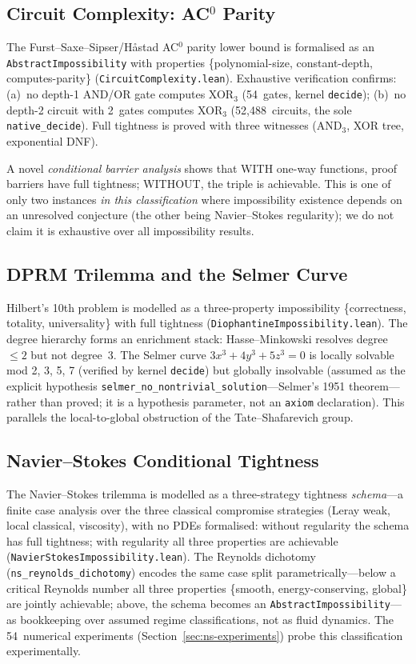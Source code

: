 \documentclass[11pt,a4paper]{article}
\begin{document}
\subsection{Circuit Complexity: AC$^0$ Parity}

The Furst--Saxe--Sipser\slash H\aa stad AC$^0$ parity lower bound is formalised as an \texttt{Abstract\allowbreak Impossibility} with properties \{polynomial-size, constant-depth, computes-parity\} (\texttt{CircuitComplexity.lean}).  Exhaustive verification confirms: (a)~no depth-1 AND/OR gate computes XOR$_3$ (54~gates, kernel \texttt{decide}); (b)~no depth-2 circuit with 2~gates computes XOR$_3$ (52,488~circuits, the sole \texttt{native\_decide}).  Full tightness is proved with three witnesses (AND$_3$, XOR tree, exponential DNF).

A novel \emph{conditional barrier analysis} shows that WITH one-way functions, proof barriers have full tightness; WITHOUT, the triple is achievable.  This is one of only two instances \emph{in this classification} where impossibility existence depends on an unresolved conjecture (the other being Navier--Stokes regularity); we do not claim it is exhaustive over all impossibility results.

\subsection{DPRM Trilemma and the Selmer Curve}

Hilbert's 10th problem is modelled as a three-property impossibility \{correctness, totality, universality\} with full tightness (\texttt{DiophantineImpossibility.lean}).  The degree hierarchy forms an enrichment stack: Hasse--Minkowski resolves degree~$\leq 2$ but not degree~3.  The Selmer curve $3x^3 + 4y^3 + 5z^3 = 0$ is locally solvable mod 2, 3, 5, 7 (verified by kernel \texttt{decide}) but globally insolvable (assumed as the explicit hypothesis \texttt{selmer\_no\_nontrivial\_solution}---Selmer's 1951 theorem---rather than proved; it is a hypothesis parameter, not an \texttt{axiom} declaration).  This parallels the local-to-global obstruction of the Tate--Shafarevich group.

\subsection{Navier--Stokes Conditional Tightness}

The Navier--Stokes trilemma is modelled as a three-strategy tightness \emph{schema}---a finite case analysis over the three classical compromise strategies (Leray weak, local classical, viscosity), with no PDEs formalised: without regularity the schema has full tightness; with regularity all three properties are achievable (\texttt{NavierStokesImpossibility.lean}).  The Reynolds dichotomy (\texttt{ns\_reynolds\_dichotomy}) encodes the same case split parametrically---below a critical Reynolds number all three properties \{smooth, energy-conserving, global\} are jointly achievable; above, the schema becomes an \texttt{AbstractImpossibility}---as bookkeeping over assumed regime classifications, not as fluid dynamics.  The 54~numerical experiments (Section~\ref{sec:ns-experiments}) probe this classification experimentally.
\end{document}

